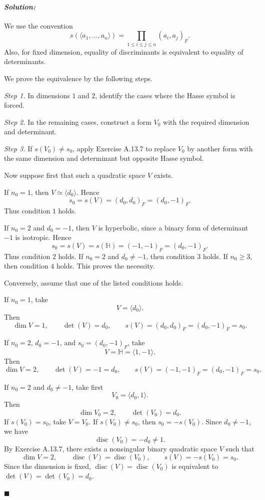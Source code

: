 \documentclass[12pt, a4paper]{article}
\newenvironment{solution}
  {\paragraph{\textit{Solution:}}\par\medskip}
  {\hfill$\blacksquare$\vspace{0.1cm}}
\begin{document}
\begin{solution}
We use the convention
\[
s(\langle a_1,\dots,a_n\rangle)
=
\prod_{1\le i\le j\le n}(a_i,a_j)_F.
\]
Also, for fixed dimension, equality of discriminants is equivalent to equality
of determinants.

We prove the equivalence by the following steps.

\emph{Step 1.} In dimensions \(1\) and \(2\), identify the cases where the
Hasse symbol is forced.

\emph{Step 2.} In the remaining cases, construct a form \(V_0\) with the
required dimension and determinant.

\emph{Step 3.} If \(s(V_0)\neq s_0\), apply Exercise A.13.7 to replace \(V_0\)
by another form with the same dimension and determinant but opposite Hasse
symbol.

Now suppose first that such a quadratic space \(V\) exists.

If \(n_0=1\), then \(V\simeq \langle d_0\rangle\). Hence
\[
s_0=s(V)=(d_0,d_0)_F=(d_0,-1)_F.
\]
Thus condition \(1\) holds.

If \(n_0=2\) and \(d_0=-1\), then \(V\) is hyperbolic, since a binary form of
determinant \(-1\) is isotropic. Hence
\[
s_0=s(V)=s(\mathbb H)=(-1,-1)_F=(d_0,-1)_F.
\]
Thus condition \(2\) holds. If \(n_0=2\) and \(d_0\neq -1\), then condition
\(3\) holds. If \(n_0\ge 3\), then condition \(4\) holds. This proves the
necessity.

Conversely, assume that one of the listed conditions holds.

If \(n_0=1\), take
\[
V=\langle d_0\rangle .
\]
Then
\[
\dim V=1,\qquad \det(V)=d_0,\qquad
s(V)=(d_0,d_0)_F=(d_0,-1)_F=s_0.
\]

If \(n_0=2\), \(d_0=-1\), and \(s_0=(d_0,-1)_F\), take
\[
V=\mathbb H=\langle 1,-1\rangle .
\]
Then
\[
\dim V=2,\qquad \det(V)=-1=d_0,\qquad
s(V)=(-1,-1)_F=(d_0,-1)_F=s_0.
\]

If \(n_0=2\) and \(d_0\neq -1\), take first
\[
V_0=\langle d_0,1\rangle .
\]
Then
\[
\dim V_0=2,\qquad \det(V_0)=d_0.
\]
If \(s(V_0)=s_0\), take \(V=V_0\). If \(s(V_0)\neq s_0\), then
\(s_0=-s(V_0)\). Since \(d_0\neq -1\), we have
\[
\operatorname{disc}(V_0)=-d_0\neq 1.
\]
By Exercise A.13.7, there exists a nonsingular binary quadratic space \(V\)
such that
\[
\dim V=2,\qquad
\operatorname{disc}(V)=\operatorname{disc}(V_0),
\qquad
s(V)=-s(V_0)=s_0.
\]
Since the dimension is fixed, \(\operatorname{disc}(V)=\operatorname{disc}(V_0)\)
is equivalent to \(\det(V)=\det(V_0)=d_0\).


\end{solution}
\end{document}

